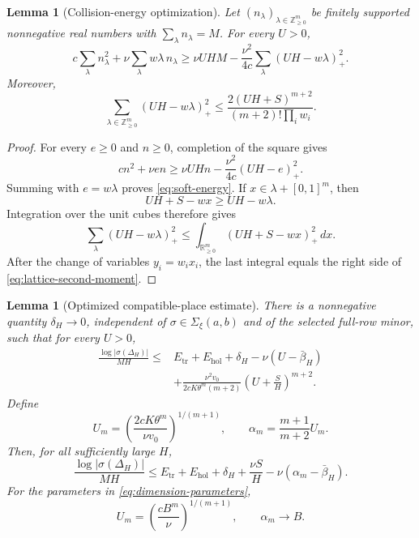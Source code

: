 \documentclass[11pt]{article}
\newcommand{\RR}{\mathbb R}
\newcommand{\NN}{\mathbb Z_{\ge 0}}
\newcommand{\Comp}{\Sigma_{\xi}(a,b)}
\newtheorem{lemma}[theorem]{Lemma}
\theoremstyle{definition}
\theoremstyle{remark}
\numberwithin{equation}{section}
\begin{document}
\begin{lemma}[Collision-energy optimization]\label{lem:collision-energy}
Let $(n_\lambda)_{\lambda\in\NN^m}$ be finitely supported nonnegative
real numbers with $\sum_\lambda n_\lambda=M$.  For every $U>0$,
\begin{equation}\label{eq:soft-energy}
 c\sum_\lambda n_\lambda^2
 +\nu\sum_\lambda w\lambda\,n_\lambda
 \ge
 \nu UHM-
 \frac{\nu^2}{4c}
 \sum_\lambda(UH-w\lambda)_+^2.
\end{equation}
Moreover,
\begin{equation}\label{eq:lattice-second-moment}
 \sum_{\lambda\in\NN^m}(UH-w\lambda)_+^2
 \le
 \frac{2(UH+S)^{m+2}}{(m+2)!\prod_iw_i}.
\end{equation}
\end{lemma}

\begin{proof}
For every $e\ge0$ and $n\ge0$, completion of the square gives
\[
 cn^2+\nu en
 \ge
 \nu UHn-\frac{\nu^2}{4c}(UH-e)_+^2.
\]
Summing with $e=w\lambda$ proves \eqref{eq:soft-energy}.  If
$x\in\lambda+[0,1]^m$, then
\[
 UH+S-wx\ge UH-w\lambda.
\]
Integration over the unit cubes therefore gives
\[
 \sum_\lambda(UH-w\lambda)_+^2
 \le
 \int_{\RR_{\ge0}^m}(UH+S-wx)_+^2\,dx.
\]
After the change of variables $y_i=w_ix_i$, the last integral equals the
right side of \eqref{eq:lattice-second-moment}.
\end{proof}

\begin{lemma}[Optimized compatible-place estimate]\label{lem:compatible}
There is a nonnegative quantity $\delta_H\to0$, independent of
$\sigma\in\Comp$ and of the selected full-row minor, such that for every
$U>0$,
\begin{align}\label{eq:compatible-bound-general}
 \frac{\log|\sigma(\Delta_H)|}{MH}
 \le{}& E_{\mathrm{tr}}+E_{\mathrm{hol}}+\delta_H
 -\nu(U-\bar\beta_H)\\
 &+\frac{\nu^2v_0}{2cK\theta^m(m+2)}
       \left(U+\frac SH\right)^{m+2}.
 \nonumber
\end{align}
Define
\begin{equation}\label{eq:Um-alpha}
 U_m=
 \left(\frac{2cK\theta^m}{\nu v_0}\right)^{1/(m+1)},
 \qquad
 \alpha_m=\frac{m+1}{m+2}U_m.
\end{equation}
Then, for all sufficiently large $H$,
\begin{equation}\label{eq:compatible-bound}
 \frac{\log|\sigma(\Delta_H)|}{MH}
 \le
 E_{\mathrm{tr}}+E_{\mathrm{hol}}+\delta_H
 +\frac{\nu S}{H}
 -\nu(\alpha_m-\bar\beta_H).
\end{equation}
For the parameters in \eqref{eq:dimension-parameters},
\begin{equation}\label{eq:Um-limit}
 U_m=\left(\frac{cB^m}{\nu}\right)^{1/(m+1)},
 \qquad \alpha_m\longrightarrow B.
\end{equation}
\end{lemma}
\end{document}
